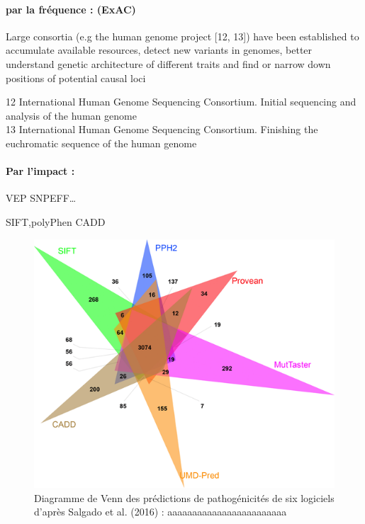\documentclass[12pt,twoside]{reedthesis}
\theoremstyle{definition}
\theoremstyle{definition}
\theoremstyle{remark}
\begin{document}
  \paragraph{par la fréquence : (ExAC)}\label{par-la-frequence-exac}
  
  Large consortia (e.g the human genome project {[}12, 13{]}) have been
  established to accumulate available resources, detect new variants in
  genomes, better understand genetic architecture of different traits and
  find or narrow down positions of potential causal loci
  
  12 International Human Genome Sequencing Consortium. Initial sequencing
  and analysis of the human genome\\
  13 International Human Genome Sequencing Consortium. Finishing the
  euchromatic sequence of the human genome
  
  \paragraph{Par l'impact :}\label{par-limpact}
  
  VEP SNPEFF\ldots{}
  
  SIFT,polyPhen CADD
  
  \begin{figure}
  
  {\centering \includegraphics[scale=.7]{figure/venn_Diag_patho_pred} 
  
  }
  
  \caption[Diagramme de Venn des prédictions de pathogénicités de six logiciels d’après Salgado et al. (2016)]{Diagramme de Venn des prédictions de pathogénicités de six logiciels d’après Salgado et al. (2016) : aaaaaaaaaaaaaaaaaaaaaaaa}\label{fig:vennpred}
  \end{figure}
  
\end{document}
